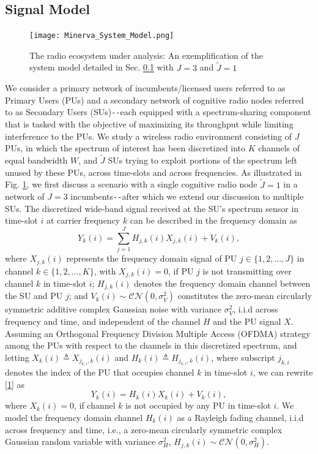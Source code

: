 \documentclass[12pt, draftcls, onecolumn]{IEEEtran}
\begin{document}
\subsection{Signal Model}\label{I.I}
\begin{figure} [htb]
    \centerline{
    \texttt{[image: Minerva\_System\_Model.png]}}
    \caption{The radio ecosystem under analysis: An exemplification of the system model detailed in Sec. \ref{I.I} with $J{=}3$ and $\tilde{J}{=}1$}
    \label{fig: A.0}
\end{figure}
We consider a primary network of incumbents/licensed users referred to as Primary Users (PUs) and a secondary network of cognitive radio nodes referred to as Secondary Users (SUs)\texttt{-{}-}each equipped with a spectrum-sharing component that is tasked with the objective of maximizing its throughput while limiting interference to the PUs. We study a wireless radio environment consisting of $J$ PUs, in which the spectrum of interest has been discretized into $K$ channels of equal bandwidth $W$, and $\tilde{J}$ SUs trying to exploit portions of the spectrum left unused by these PUs, across time-slots and across frequencies. As illustrated in Fig. \ref{fig: A.0}, we first discuss a scenario with a single cognitive radio node $\tilde{J}{=}1$ in a network of $J{=}3$ incumbents\texttt{-{}-}after which we extend our discussion to multiple SUs. The discretized wide-band signal received at the SU's spectrum sensor in time-slot $i$ at carrier frequency $k$ can be described in the frequency domain as
\begin{equation}\label{1}
    Y_{k}(i)=\sum_{j{=}1}^{J}{H_{j,k}(i)X_{j,k}(i)+V_{k}(i)},
\end{equation}
where $X_{j,k}(i)$ represents the frequency domain signal of PU $j{\in}\{1,2,\dots,J\}$ in channel $k \in \{1,2,\dots,K\}$, with $X_{j,k}(i){=}0$, if PU $j$ is not transmitting over channel $k$ in time-slot $i$; $H_{j,k}(i)$ denotes the frequency domain channel between the SU and PU $j$; and $V_{k}(i){\sim}\mathcal{CN}(0,\sigma_{V}^{2})$ constitutes the zero-mean circularly symmetric additive complex Gaussian noise with variance $\sigma_{V}^{2}$, i.i.d across frequency and time, and independent of the channel $H$ and the PU signal $X$. Assuming an Orthogonal Frequency Division Multiple Access (OFDMA) strategy among the PUs with respect to the channels in this discretized spectrum, and letting $X_{k}(i){\triangleq}X_{j_{k,i},k}(i)$ and $H_{k}(i){\triangleq}H_{j_{k,i},k}(i)$, where subscript $j_{k,i}$ denotes the index of the PU that occupies channel $k$ in time-slot $i$, we can rewrite \eqref{1} as
\begin{equation}\label{2}
    Y_{k}(i)=H_{k}(i)X_{k}(i)+V_{k}(i),
\end{equation}
where $X_{k}(i){=}0$, if channel $k$ is not occupied by any PU in time-slot $i$. We model the frequency domain channel $H_{k}(i)$ as a Rayleigh fading channel, i.i.d across frequency and time, i.e., a zero-mean circularly symmetric complex Gaussian random variable with variance $\sigma_{H}^{2}$, $H_{j,k}(i) \sim \mathcal{CN}(0,\sigma_{H}^{2})$.
\end{document}
